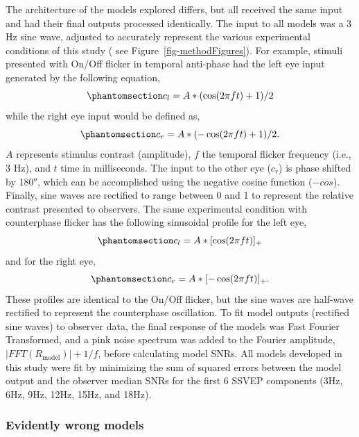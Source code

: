 \documentclass[
  12pt,
]{article}
\begin{document}
The architecture of the models explored differs, but all received the
same input and had their final outputs processed identically. The input
to all models was a 3 Hz sine wave, adjusted to accurately represent the
various experimental conditions of this study ( see
Figure~\ref{fig-methodFigures}). For example, stimuli presented with
On/Off flicker in temporal anti-phase had the left eye input generated
by the following equation,
\begin{equation}\phantomsection\label{eq-stimInput2L}{
c_l = A * (\cos(2 \pi ft)+1)/2
}\end{equation} while the right eye input would be defined as,
\begin{equation}\phantomsection\label{eq-stimInput2R}{
c_r = A * (-\cos(2 \pi ft)+1)/2.
}\end{equation} \(A\) represents stimulus contrast (amplitude), \(f\)
the temporal flicker frequency (i.e., 3 Hz), and \(t\) time in
milliseconds. The input to the other eye (\(c_r\)) is phase shifted by
180\(^o\), which can be accomplished using the negative cosine function
(\(-cos\)). Finally, sine waves are rectified to range between 0 and 1
to represent the relative contrast presented to observers. The same
experimental condition with counterphase flicker has the following
sinusoidal profile for the left eye,
\begin{equation}\phantomsection\label{eq-stimInput3L}{
c_l = A * [\cos(2 \pi ft)]_+
}\end{equation} and for the right eye,
\begin{equation}\phantomsection\label{eq-stimInput3R}{
c_r = A * [-\cos(2 \pi ft)]_+.
}\end{equation} These profiles are identical to the On/Off flicker, but
the sine waves are half-wave rectified to represent the counterphase
oscillation. To fit model outputs (rectified sine waves) to observer
data, the final response of the models was Fast Fourier Transformed, and
a pink noise spectrum was added to the Fourier amplitude,
\(|FFT(R_\text{model})|+1/f\), before calculating model SNRs. All models
developed in this study were fit by minimizing the sum of squared errors
between the model output and the observer median SNRs for the first 6
SSVEP components (3Hz, 6Hz, 9Hz, 12Hz, 15Hz, and 18Hz).

\subsubsection{Evidently wrong models}\label{evidently-wrong-models}
\end{document}
